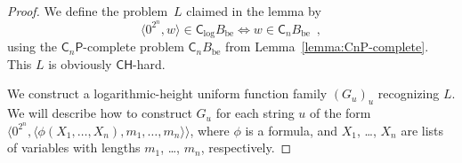 \documentclass[12pt,a4paper]{article}
\theoremstyle{definition}
\theoremstyle{remark}
\newcommand{\classP}{\mathsf{P}}
\newcommand{\classCH}{\mathsf{CH}}
\newcommand{\quantC}{\mathsf{C}}
\begin{document}
\begin{proof}
We define the problem~$L$ claimed in the lemma by
\begin{equation}
\label{equation: definition of padded CQBF}
 \langle 0^{2^n}, w \rangle \in \quantC_{\log} B_{\mathrm{be}}
 \iff
 w \in \quantC_n B_{\mathrm{be}} \enspace , 
\end{equation}
using the $\quantC _n \classP$-complete problem $\quantC_n B_{\mathrm{be}}$ 
from Lemma~\ref{lemma:CnP-complete}. 
This $L$ is obviously $\classCH$-hard. 

We construct a logarithmic-height uniform function family $(G_u)_u$
recognizing $L$.
We will describe how to construct $G _u$ 
for each string $u$ of the form $\langle 0^{2^n}, \allowbreak
\langle \phi(X_1, \dots, X_n), m_1, \dots, m_n \rangle \rangle$, 
where 
$\phi$ is a formula, and 
$X _1$, \ldots, $X _n$ are lists of variables
with lengths $m _1$, \ldots, $m _n$, respectively. 
 

\end{proof}
\end{document}
